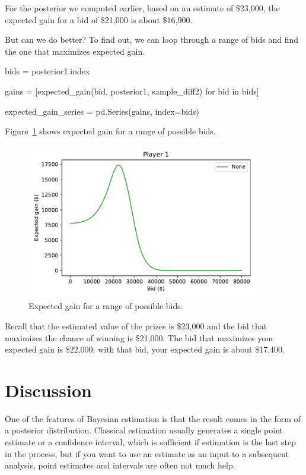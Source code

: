 \documentclass[12pt]{book}
\theoremstyle{exercise}
\begin{document}
For the posterior we computed earlier, based on an estimate of \$23,000,
the expected gain for a bid of \$21,000
is about \$16,900.

But can we do better?
To find out, we can loop through a range of bids and find the one that maximizes expected gain.

\begin{code}
bids = posterior1.index

gains = [expected_gain(bid, posterior1, sample_diff2) for bid in bids]

expected_gain_series = pd.Series(gains, index=bids)
\end{code}

Figure~\ref{fig08-06} shows expected gain for a range of possible bids.

\begin{figure}
\centerline{\includegraphics[width=4in]{figs/fig08-06.pdf}}
\caption{Expected gain for a range of possible bids.}
\label{fig08-06}
\end{figure}

Recall that the estimated value of the prizes is \$23,000 and the bid that maximizes the chance of winning is \$21,000.
The bid that maximizes your expected gain is \$22,000; with that bid, your expected gain is about \$17,400.


\section{Discussion}

One of the features of Bayesian estimation is that the
result comes in the form of a posterior distribution.  Classical
estimation usually generates a single point estimate or a confidence
interval, which is sufficient if estimation is the last step in the
process, but if you want to use an estimate as an input to a
subsequent analysis, point estimates and intervals are often not much
help.
\end{document}
